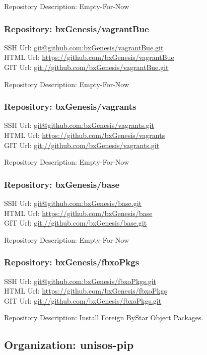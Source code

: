 Repository Description: Empty-For-Now

\subsubsection{Repository: bxGenesis/vagrantBue}

SSH Url:  \url{git@github.com:bxGenesis/vagrantBue.git}\\
HTML Url: \url{https://github.com/bxGenesis/vagrantBue}\\
GIT Url:  \url{git://github.com/bxGenesis/vagrantBue.git}

Repository Description: Empty-For-Now

\subsubsection{Repository: bxGenesis/vagrants}

SSH Url:  \url{git@github.com:bxGenesis/vagrants.git}\\
HTML Url: \url{https://github.com/bxGenesis/vagrants}\\
GIT Url:  \url{git://github.com/bxGenesis/vagrants.git}

Repository Description: Empty-For-Now

\subsubsection{Repository: bxGenesis/base}

SSH Url:  \url{git@github.com:bxGenesis/base.git}\\
HTML Url: \url{https://github.com/bxGenesis/base}\\
GIT Url:  \url{git://github.com/bxGenesis/base.git}

Repository Description: Empty-For-Now

\subsubsection{Repository: bxGenesis/fbxoPkgs}

SSH Url:  \url{git@github.com:bxGenesis/fbxoPkgs.git}\\
HTML Url: \url{https://github.com/bxGenesis/fbxoPkgs}\\
GIT Url:  \url{git://github.com/bxGenesis/fbxoPkgs.git}

Repository Description: Install Foreign ByStar Object Packages.

\subsection{Organization: unisos-pip}

